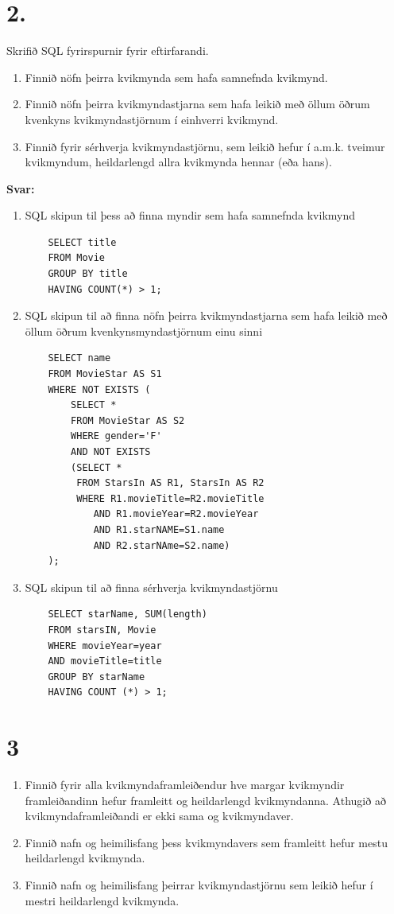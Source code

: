 \documentclass{article}
\newcommand{\sv}{\textbf{Svar:}}
\newcommand{\enum}{\begin{enumerate}[label = \alph*.]}
\begin{document}
\newpage

\section{2.}
Skrifið SQL fyrirspurnir fyrir eftirfarandi.

\enum
\item Finnið nöfn þeirra kvikmynda sem hafa samnefnda kvikmynd.
\item Finnið nöfn þeirra kvikmyndastjarna sem hafa leikið með
öllum öðrum kvenkyns kvikmyndastjörnum í einhverri kvikmynd.
\item Finnið fyrir sérhverja kvikmyndastjörnu, sem leikið hefur í
a.m.k. tveimur kvikmyndum, heildarlengd allra kvikmynda hennar
(eða hans).
\end{enumerate}

\sv
\enum
\item SQL skipun til þess að finna myndir sem hafa samnefnda kvikmynd
\begin{verbatim}
    SELECT title 
    FROM Movie
    GROUP BY title
    HAVING COUNT(*) > 1;
\end{verbatim}
\item SQL skipun til að finna nöfn þeirra kvikmyndastjarna sem hafa leikið með öllum öðrum kvenkynsmyndastjörnum einu sinni
\begin{verbatim}
    SELECT name
    FROM MovieStar AS S1
    WHERE NOT EXISTS (
        SELECT *
        FROM MovieStar AS S2
        WHERE gender='F'
        AND NOT EXISTS
        (SELECT * 
         FROM StarsIn AS R1, StarsIn AS R2
         WHERE R1.movieTitle=R2.movieTitle
            AND R1.movieYear=R2.movieYear
            AND R1.starNAME=S1.name
            AND R2.starNAme=S2.name)
    );
\end{verbatim}
\item  SQL skipun til að finna sérhverja kvikmyndastjörnu 
\begin{verbatim}
    SELECT starName, SUM(length)
    FROM starsIN, Movie 
    WHERE movieYear=year
    AND movieTitle=title
    GROUP BY starName
    HAVING COUNT (*) > 1;
\end{verbatim}
\end{enumerate}


\vspace{1cm}

\section{3}
\enum
\item Finnið fyrir alla kvikmyndaframleiðendur hve margar
kvikmyndir framleiðandinn hefur framleitt og heildarlengd 
kvikmyndanna. Athugið að kvikmyndaframleiðandi er ekki sama og
kvikmyndaver. 
\item Finnið nafn og heimilisfang þess kvikmyndavers sem framleitt
hefur mestu heildarlengd kvikmynda.
\item Finnið nafn og heimilisfang þeirrar kvikmyndastjörnu sem
leikið hefur í mestri heildarlengd kvikmynda.
\end{enumerate}
\end{document}
